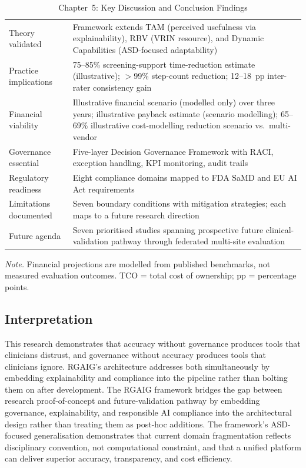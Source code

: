 \begin{table}[H]
\tablestripes
\tablefontsize
\caption[Chapter 5 key findings]{Chapter~5: Key Discussion and Conclusion Findings}
\begin{tabularx}{\textwidth}{@{} p{4cm} L @{}}
\toprule
{} &  \\
\midrule
Theory validated & Framework extends TAM (perceived usefulness via explainability), RBV (VRIN resource), and Dynamic Capabilities (ASD-focused adaptability) \\
Practice implications & 75--85\% screening-support time-reduction estimate (illustrative); $>$99\% step-count reduction; 12--18~pp inter-rater consistency gain \\
Financial viability & Illustrative financial scenario (modelled only) over three years; illustrative payback estimate (scenario modelling); 65--69\% illustrative cost-modelling reduction scenario vs.\ multi-vendor \\
Governance essential & Five-layer Decision Governance Framework with RACI, exception handling, KPI monitoring, audit trails \\
Regulatory readiness & Eight compliance domains mapped to FDA SaMD and EU AI Act requirements \\
Limitations documented & Seven boundary conditions with mitigation strategies; each maps to a future research direction \\
Future agenda & Seven prioritised studies spanning prospective future clinical-validation pathway through federated multi-site evaluation \\
\bottomrule
\end{tabularx}
\vspace{0.5em}\noindent\textit{Note.} Financial projections are modelled from published benchmarks, not measured evaluation outcomes. TCO = total cost of ownership; pp = percentage points.
\end{table}

\subsection{Interpretation}

This research demonstrates that accuracy without governance produces tools that clinicians distrust, and governance without accuracy produces tools that clinicians ignore. RGAIG's architecture addresses both simultaneously by embedding explainability and compliance into the pipeline rather than bolting them on after development. The RGAIG framework bridges the gap between research proof-of-concept and future-validation pathway by embedding governance, explainability, and responsible AI compliance into the architectural design rather than treating them as post-hoc additions. The framework's ASD-focused generalisation demonstrates that current domain fragmentation reflects disciplinary convention, not computational constraint, and that a unified platform can deliver superior accuracy, transparency, and cost efficiency.

